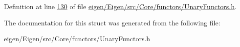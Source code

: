 Definition at line \hyperlink{eigen_2_eigen_2src_2_core_2functors_2_unary_functors_8h_source_l00130}{130} of file \hyperlink{eigen_2_eigen_2src_2_core_2functors_2_unary_functors_8h_source}{eigen/\+Eigen/src/\+Core/functors/\+Unary\+Functors.\+h}.



The documentation for this struct was generated from the following file\+:\begin{DoxyCompactItemize}
\item 
eigen/\+Eigen/src/\+Core/functors/\+Unary\+Functors.\+h\end{DoxyCompactItemize}
